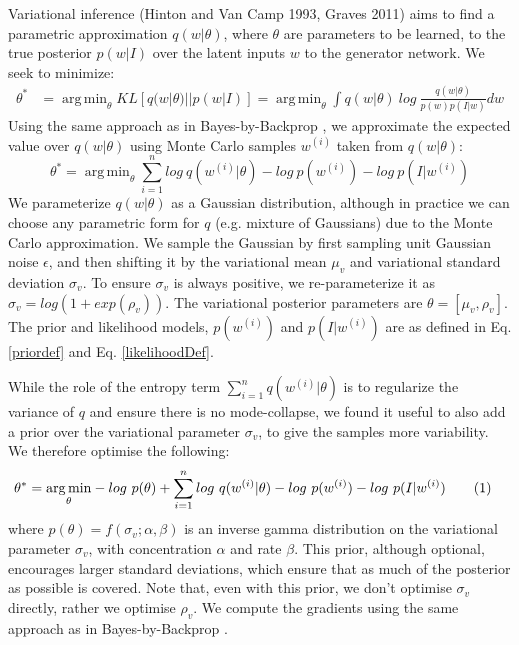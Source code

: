 \documentclass{article}
\newcommand\numberthis{\addtocounter{equation}{1}\tag{\theequation}}
\DeclareMathOperator*{\argmin}{arg\,min}
\begin{document}
Variational inference (Hinton and Van Camp 1993, Graves 2011) aims to find a parametric approximation $q(w|\theta)$, where $\theta$ are parameters to be learned, to the true posterior $p(w|I)$ over the latent inputs $w$ to the generator network. We seek to minimize:
\begin{align*}
\theta^* & = \argmin_{\theta} KL\left[q(w|\theta)||p(w|I)\right] = \argmin_{\theta} \int q(w|\theta)\ log\ \frac{q(w|\theta)}{p(w)p(I|w)} dw
\end{align*}
Using the same approach as in Bayes-by-Backprop \cite{blundell2015weight}, we approximate the expected value over $q(w|\theta)$ using Monte Carlo samples $w^{(i)}$ taken from $q(w|\theta)$:
\begin{equation}
\theta^* = \argmin_{\theta} \sum_{i=1}^n log\ q(w^{(i)}|\theta) - log\ p(w^{(i)}) -  log\  p(I|w^{(i)})
\end{equation}
We parameterize $q(w|\theta)$ as a Gaussian distribution, although in practice we can choose any parametric form for $q$ (e.g. mixture of Gaussians) due to the Monte Carlo approximation. We sample the Gaussian by first sampling unit Gaussian noise $\epsilon$, and then shifting it by the variational mean $\mu_v$ and variational standard deviation $\sigma_v$. To ensure $\sigma_v$ is always positive, we re-parameterize it as $\sigma_v = log(1+exp(\rho_v))$. The variational posterior parameters are $\theta = [\mu_v, \rho_v]$. The prior and likelihood models, $p(w^{(i)})$ and $p(I|w^{(i)})$ are as defined in Eq. \ref{priordef} and Eq. \ref{likelihoodDef}.

While the role of the entropy term $\sum_{i=1}^n q(w^{(i)}|\theta)$ is to regularize the variance of $q$ and ensure there is no mode-collapse, we found it useful to also add a prior over the variational parameter $\sigma_v$, to give the samples more variability. We therefore optimise the following:
\begin{align*}
\theta^* = \argmin_{\theta} & -log\ p(\theta) + \sum_{i=1}^n log\ q(w^{(i)}|\theta) - log\ p(w^{(i)}) - log\  p(I|w^{(i)}) \numberthis \label{variationalloss}
\end{align*} 
where $p(\theta) = f(\sigma_v; \alpha, \beta)$ is an inverse gamma distribution on the variational parameter $\sigma_v$, with concentration $\alpha$ and rate $\beta$. This prior, although optional, encourages larger standard deviations, which ensure that as much of the posterior as possible is covered. Note that, even with this prior, we don't optimise $\sigma_v$ directly, rather we optimise $\rho_v$. We compute the gradients using the same approach as in Bayes-by-Backprop \cite{blundell2015weight}.
\end{document}
